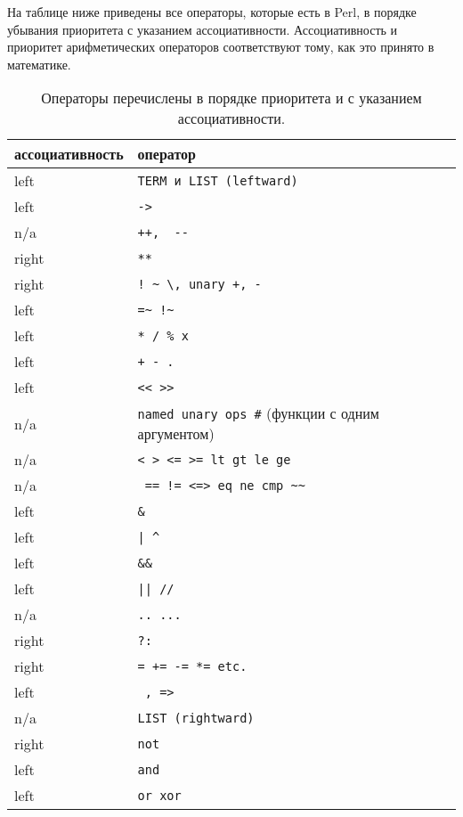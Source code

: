На таблице ниже приведены все операторы, которые есть в Perl, в порядке убывания приоритета с указанием ассоциативности. Ассоциативность и приоритет арифметических операторов соответствуют тому, как это принято в математике.
\begin{table}[H] \centering
  \begin{tabular}{ |p{4cm}|p{5cm}| } \hline
    ассоциативность & оператор \\ \hline
    left  & \verb|TERM и LIST (leftward)| \\ \hline
    left  & \verb|->|       \\ \hline
    n/a   & \verb|++,  --|  \\ \hline
    right & \verb|**|       \\ \hline
    right & \verb|! ~ \, unary +, - |     \\ \hline
    left  & \verb|=~ !~|    \\ \hline
    left  & \verb|* / % x|  \\ \hline
    left  & \verb|+ - .|    \\ \hline
    left  & \verb|<< >>|    \\ \hline
    n/a   & \verb|named unary ops #| \newline (функции с одним аргументом)  \\ \hline
    n/a   & \verb|< > <= >= lt gt le ge|     \\ \hline
    n/a   & \verb| == != <=> eq ne cmp ~~|   \\ \hline
    left  & \verb|&|       \\ \hline
    left  & \verb+| ^+     \\ \hline
    left  & \verb|&&|      \\ \hline
    left  & \verb+|| //+   \\ \hline
    n/a   & \verb|.. ...|  \\ \hline
    right & \verb|?:|      \\ \hline
    right & \verb|= += -= *= etc.|   \\ \hline
    left  & \verb| , =>|   \\ \hline

    n/a   & \verb|LIST (rightward)|  \\ \hline
    right & \verb|not|    \\ \hline
    left  & \verb|and|    \\ \hline
    left  & \verb|or xor| \\ \hline
  \end{tabular}
  \caption{Операторы перечислены в порядке приоритета и с указанием ассоциативности.}
\end{table}

